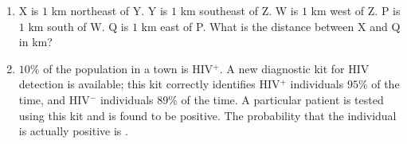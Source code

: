 \documentclass[journal,12pt,onecolumn]{IEEEtran}
\theoremstyle{remark}
\begin{document}
\begin{enumerate}
    \item X is $1$ km northeast of Y. Y is $1$ km southeast of Z. W is $1$ km west of Z. P is $1$ km south of W. Q is $1$ km east of P. What is the distance between X and Q in km?
    
    \hfill{}
    \begin{enumerate}
    \end{enumerate}

    \item $10\%$ of the population in a town is HIV$^+$. A new diagnostic kit for HIV detection is available; this kit correctly identifies HIV$^+$ individuals $95\%$ of the time, and HIV$^-$ individuals $89\%$ of the time. A particular patient is tested using this kit and is found to be positive. The probability that the individual is actually positive is \underline{\hspace{2cm}}.
    
    \hfill{}
\end{enumerate}
\end{document}
